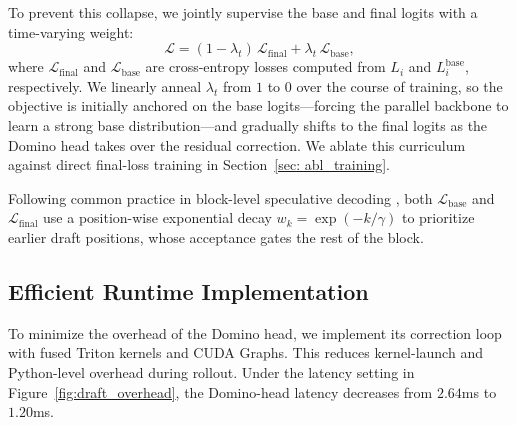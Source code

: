 \documentclass{llmxive}
\begin{document}
To prevent this collapse, we jointly supervise the base and final logits with a time-varying weight:
  \[
  \mathcal{L}
  =
  (1-\lambda_t)\,\mathcal{L}_{\mathrm{final}}
  +
  \lambda_t\,\mathcal{L}_{\mathrm{base}},
  \]
where \(\mathcal{L}_{\mathrm{final}}\) and \(\mathcal{L}_{\mathrm{base}}\) are cross-entropy losses computed from \(L_i\) and \(L_i^{\mathrm{base}}\), respectively. We linearly anneal \(\lambda_t\) from
\(1\) to \(0\) over the course of training, so the objective is initially anchored on the base logits---forcing the parallel backbone to learn a strong base distribution---and gradually shifts to the final
logits as the Domino head takes over the residual correction. We ablate this curriculum against direct final-loss training in Section~\ref{sec: abl_training}.

Following common practice in block-level speculative decoding \citep{chen2026dflash}, both \(\mathcal{L}_{\mathrm{base}}\) and \(\mathcal{L}_{\mathrm{final}}\) use a position-wise exponential
decay \(w_k = \exp(-k/\gamma)\) to prioritize earlier draft positions, whose acceptance gates the rest of the block.
  
\subsection{Efficient Runtime Implementation}
\label{sec:runtime_optimization}

To minimize the overhead of the Domino head, we implement its correction loop with fused Triton kernels and CUDA Graphs. This reduces kernel-launch and Python-level overhead during rollout. Under the latency setting in Figure~\ref{fig:draft_overhead}, the Domino-head latency decreases from \(2.64\)ms to \(1.20\)ms.
\end{document}

